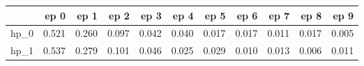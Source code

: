 \begin{tabular}{lrrrrrrrrrr}
\toprule
{} &   ep 0 &   ep 1 &   ep 2 &   ep 3 &   ep 4 &   ep 5 &   ep 6 &   ep 7 &   ep 8 &   ep 9 \\
\midrule
hp\_0 &  0.521 &  0.260 &  0.097 &  0.042 &  0.040 &  0.017 &  0.017 &  0.011 &  0.017 &  0.005 \\
hp\_1 &  0.537 &  0.279 &  0.101 &  0.046 &  0.025 &  0.029 &  0.010 &  0.013 &  0.006 &  0.011 \\
\bottomrule
\end{tabular}
